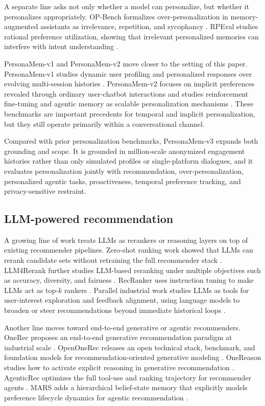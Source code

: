 \documentclass[]{fairmeta}
\begin{document}
A separate line asks not only whether a model can personalize, but whether it personalizes appropriately. OP-Bench formalizes over-personalization in memory-augmented assistants as irrelevance, repetition, and sycophancy \citep{hu2026op}. RPEval studies rational preference utilization, showing that irrelevant personalized memories can interfere with intent understanding \citep{feng2026rpeval}.

PersonaMem-v1 and PersonaMem-v2 move closer to the setting of this paper. PersonaMem-v1 studies dynamic user profiling and personalized responses over evolving multi-session histories \citep{jiang2025know}. PersonaMem-v2 focuses on implicit preferences revealed through ordinary user-chatbot interactions and studies reinforcement fine-tuning and agentic memory as scalable personalization mechanisms \citep{jiang2025personamem}. These benchmarks are important precedents for temporal and implicit personalization, but they still operate primarily within a conversational channel.

Compared with prior personalization benchmarks, PersonaMem-v3 expands both grounding and scope. It is grounded in million-scale anonymized engagement histories rather than only simulated profiles or single-platform dialogues, and it evaluates personalization jointly with recommendation, over-personalization, personalized agentic tasks, proactiveness, temporal preference tracking, and privacy-sensitive restraint.

\subsection{LLM-powered recommendation}

A growing line of work treats LLMs as rerankers or reasoning layers on top of existing recommender pipelines. Zero-shot ranking work showed that LLMs can rerank candidate sets without retraining the full recommender stack \citep{hou2024zeroshotrankers}. LLM4Rerank further studies LLM-based reranking under multiple objectives such as accuracy, diversity, and fairness \citep{gao2025llm4rerank}. RecRanker uses instruction tuning to make LLMs act as top-$k$ rankers \citep{luo2025recranker}. Parallel industrial work studies LLMs as tools for user-interest exploration and feedback alignment, using language models to broaden or steer recommendations beyond immediate historical loops \citep{wang2024interestexploration,wang2025userfeedbackalignment}.

Another line moves toward end-to-end generative or agentic recommenders. OneRec proposes an end-to-end generative recommendation paradigm at industrial scale \citep{zhou2025onerec}. OpenOneRec releases an open technical stack, benchmark, and foundation models for recommendation-oriented generative modeling \citep{zhou2025openonerec}. OneReason studies how to activate explicit reasoning in generative recommendation \citep{onereason2026technical}. AgenticRec optimizes the full tool-use and ranking trajectory for recommender agents \citep{li2026agenticrec}. MARS adds a hierarchical belief-state memory that explicitly models preference lifecycle dynamics for agentic recommendation \citep{shen2026mars}.
\end{document}
